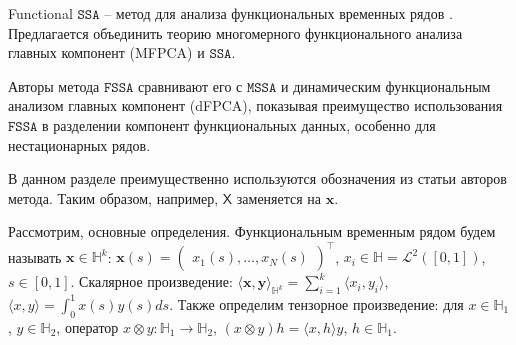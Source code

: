 \documentclass[12pt, specialist, subf
]{disser}
\theoremstyle{definition}
\newcommand{\SSA}{\texttt{SSA}}
\newcommand{\MSSA}{\texttt{MSSA}}
\newcommand{\FSSA}{\texttt{FSSA}}
\newcommand{\TS}{\mathsf{X}}
\begin{document}
Functional $\SSA$ -- метод для анализа функциональных временных рядов \cite{haghbin2019functionalsingularspectrumanalysis}. Предлагается объединить теорию многомерного функционального анализа главных компонент (MFPCA) и $\SSA$.

Авторы метода $\FSSA$ сравнивают его с $\MSSA$ и динамическим функциональным анализом главных компонент (dFPCA), показывая преимущество использования $\FSSA$ в разделении компонент функциональных данных, особенно для нестационарных рядов.

В данном разделе преимущественно используются обозначения из статьи \cite{haghbin2019functionalsingularspectrumanalysis} авторов метода. Таким образом, например, $\TS$ заменяется на $\pmb x$.





Рассмотрим, основные определения.
Функциональным временным рядом будем называть ${\pmb x}\in\mathbb{H}^k$: ${\pmb x}(s)=\begin{pmatrix} x_1(s),\ldots,x_N(s)\end{pmatrix}^\top$, $x_i\in\mathbb{H} =\mathcal{L}^2([0,1])$, $s\in[0,1]$. Скалярное произведение: $\langle\pmb x,\pmb y\rangle_{\mathbb{H}^k}=\sum_{i=1}^k\langle x_i,y_i\rangle$, $\langle x,y\rangle=\int_0^1 x(s)y(s)ds$. Также определим тензорное произведение: для $x\in\mathbb{H}_1$, $y\in\mathbb{H}_2$, оператор $x\otimes y:\mathbb{H}_1\to\mathbb{H}_2$, $(x\otimes y)h=\langle x,h\rangle y$, $h\in\mathbb{H}_1$.



\end{document}
